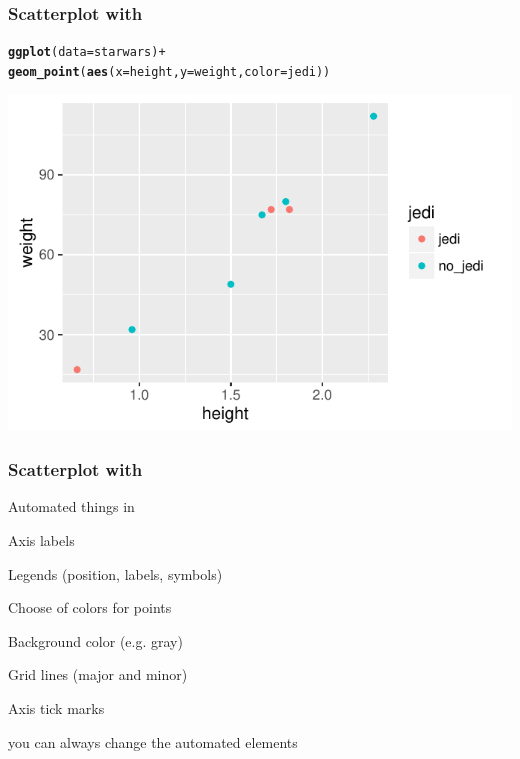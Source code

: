 \documentclass[12pt]{beamer}\usepackage[]{graphicx}\usepackage[]{color}
\makeatletter
\newcommand{\hlopt}[1]{\textcolor[rgb]{0,0,0}{#1}}%
\newcommand{\hlstd}[1]{\textcolor[rgb]{0.345,0.345,0.345}{#1}}%
\newcommand{\hlkwc}[1]{\textcolor[rgb]{0.333,0.667,0.333}{#1}}%
\newcommand{\hlkwd}[1]{\textcolor[rgb]{0.737,0.353,0.396}{\textbf{#1}}}%
\newenvironment{kframe}{%
 \def\at@end@of@kframe{}%
 \ifinner\ifhmode%
  \def\at@end@of@kframe{\end{minipage}}%
  \begin{minipage}{\columnwidth}%
 \fi\fi%
 \def\FrameCommand##1{\hskip\@totalleftmargin \hskip-\fboxsep
 \colorbox{shadecolor}{##1}\hskip-\fboxsep
     \hskip-\linewidth \hskip-\@totalleftmargin \hskip\columnwidth}%
 \MakeFramed {\advance\hsize-\width
   \@totalleftmargin\z@ \linewidth\hsize
   \@setminipage}}%
 {\par\unskip\endMakeFramed%
 \at@end@of@kframe}
\newenvironment{knitrout}{}{} %
\makeatother
\begin{document}

\begin{frame}[fragile]
\frametitle{Scatterplot with }
\begin{knitrout}\scriptsize
{}\color{fgcolor}\begin{kframe}
\begin{alltt}
\hlkwd{ggplot}\hlstd{(}\hlkwc{data} \hlstd{= starwars)} \hlopt{+}
  \hlkwd{geom_point}\hlstd{(}\hlkwd{aes}\hlstd{(}\hlkwc{x} \hlstd{= height,} \hlkwc{y} \hlstd{= weight,} \hlkwc{color} \hlstd{= jedi))}
\end{alltt}
\end{kframe}

{\centering \includegraphics[width=.8\linewidth,height=.5\linewidth]{figure/sw_scatterplot-1} 

}



\end{knitrout}
\end{frame}


\begin{frame}[fragile]
\frametitle{Scatterplot with }

Automated things in 
\bi
  \item Axis labels
  \item Legends (position, labels, symbols)
  \item Choose of colors for points
  \item Background color (e.g. gray)
  \item Grid lines (major and minor)
  \item Axis tick marks
\ei

{\lit \small you can always change the automated elements}

\end{frame}
\end{document}

